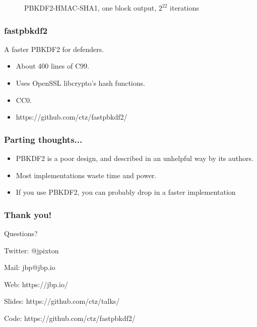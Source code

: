 \documentclass{beamer}
\begin{document}
{\begin{figure}
  
  \caption{PBKDF2-HMAC-SHA1, one block output, $2^{22}$ iterations}
  \end{figure}

}

\frame
{
  \frametitle{fastpbkdf2}

  A faster PBKDF2 for defenders.

  \begin{itemize}
    \item<1-> About 400 lines of C99.
    \item<2-> Uses OpenSSL libcrypto's hash functions.
    \item<3-> CC0.
    \item<4-> https://github.com/ctz/fastpbkdf2/
  \end{itemize}
}

\frame
{
  \frametitle{Parting thoughts...}

  \begin{itemize}
    \item<1-> PBKDF2 is a poor design, and described in an unhelpful way by its authors.
    \item<2-> Most implementations waste time and power.
    \item<3-> If you use PBKDF2, you can probably drop in a faster implementation
  \end{itemize}
}

\frame
{
  \frametitle{Thank you!}
  Questions?

  \vspace{5em}

  Twitter: @jpixton

  Mail: jbp@jbp.io

  Web: https://jbp.io/

  Slides: https://github.com/ctz/talks/

  Code: https://github.com/ctz/fastpbkdf2/
}
\end{document}
